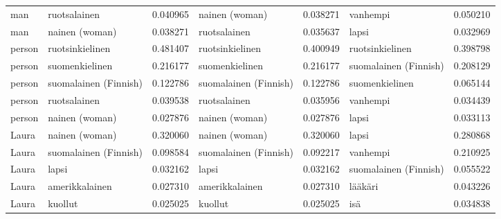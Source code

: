 \begin{longtable}{llrlrlr}
   man &          ruotsalainen &                         0.040965 &         nainen (woman) &                              0.038271 &              vanhempi &                        0.050210 \\
   man &        nainen (woman) &                         0.038271 &           ruotsalainen &                              0.035637 &                 lapsi &                        0.032969 \\
person &       ruotsinkielinen &                         0.481407 &        ruotsinkielinen &                              0.400949 &       ruotsinkielinen &                        0.398798 \\
person &        suomenkielinen &                         0.216177 &         suomenkielinen &                              0.216177 & suomalainen (Finnish) &                        0.208129 \\
person & suomalainen (Finnish) &                         0.122786 &  suomalainen (Finnish) &                              0.122786 &        suomenkielinen &                        0.065144 \\
person &          ruotsalainen &                         0.039538 &           ruotsalainen &                              0.035956 &              vanhempi &                        0.034439 \\
person &        nainen (woman) &                         0.027876 &         nainen (woman) &                              0.027876 &                 lapsi &                        0.033113 \\
 Laura &        nainen (woman) &                         0.320060 &         nainen (woman) &                              0.320060 &                 lapsi &                        0.280868 \\
 Laura & suomalainen (Finnish) &                         0.098584 &  suomalainen (Finnish) &                              0.092217 &              vanhempi &                        0.210925 \\
 Laura &                 lapsi &                         0.032162 &                  lapsi &                              0.032162 & suomalainen (Finnish) &                        0.055522 \\
 Laura &        amerikkalainen &                         0.027310 &         amerikkalainen &                              0.027310 &               lääkäri &                        0.043226 \\
 Laura &               kuollut &                         0.025025 &                kuollut &                              0.025025 &                   isä &                        0.034838 \\

\end{longtable}
